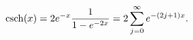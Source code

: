 \begin{equation}
{\rm csch} (x) = 2 e^{-x} \frac{1}{1 - e^{-2x}} = 2 \sum_{j = 0}^{\infty}
e^{- (2j +1) x}.
\end{equation}


